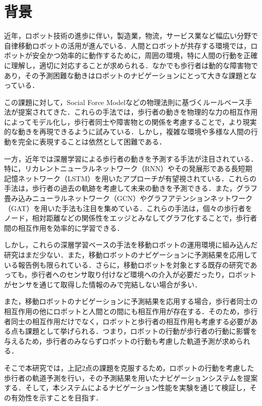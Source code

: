 
\section{背景}
近年，ロボット技術の進歩に伴い，製造業，物流，サービス業など幅広い分野で自律移動ロボットの活用が進んでいる．人間とロボットが共存する環境では，ロボットが安全かつ効率的に動作するために，周囲の環境，特に人間の行動を正確に理解し，適切に対応することが求められる．なかでも歩行者は動的な障害物であり，その予測困難な動きはロボットのナビゲーションにとって大きな課題となっている．

この課題に対して，Social Force Model\cite{s-force-model}などの物理法則に基づくルールベース手法が提案されてきた．これらの手法では，歩行者の動きを物理的な力の相互作用によってモデル化し，歩行者同士や障害物との関係を考慮することで，より現実的な動きを再現できるように試みている．しかし，複雑な環境や多様な人間の行動を完全に表現することは依然として困難である．

一方，近年では深層学習による歩行者の動きを予測する手法が注目されている．特に，リカレントニューラルネットワーク（RNN）\cite{rumelhart1986learning1,rumelhart1986learning2}やその発展形である長短期記憶ネットワーク（LSTM）\cite{hochreiter1997long}を用いたアプローチが有望視されている．これらの手法は，歩行者の過去の軌跡を考慮して未来の動きを予測できる．また，グラフ畳み込みニューラルネットワーク（GCN）\cite{kipf2016semi-gcn}やグラフアテンションネットワーク（GAT）\cite{velickovic2017graph-gat}を用いた手法も注目を集めている．これらの手法は，個々の歩行者をノード，相対距離などの関係性をエッジとみなしてグラフ化することで，歩行者間の相互作用を効率的に学習できる．

しかし，これらの深層学習ベースの手法を移動ロボットの運用環境に組み込んだ研究はまだ少ない．また，移動ロボットのナビゲーションに予測結果を応用している報告例も限られている．さらに，移動ロボットを対象とする既存の研究であっても，歩行者へのセンサ取り付けなど環境への介入が必要だったり，ロボットがセンサを通じて取得した情報のみで完結しない場合が多い．

また，移動ロボットのナビゲーションに予測結果を応用する場合，歩行者同士の相互作用の他にロボットと人間との間にも相互作用が存在する．そのため，歩行者同士の相互作用だけでなく，ロボットと歩行者の相互作用も考慮する必要がある点も課題として挙げられる．つまり，ロボットの行動が歩行者の行動に影響を与えるため，歩行者のみならずロボットの行動も考慮した軌道予測が求められる．

そこで本研究では，上記2点の課題を克服するため，ロボットの行動を考慮した歩行者の軌道予測を行い，その予測結果を用いたナビゲーションシステムを提案する．そして，本システムによるナビゲーション性能を実験を通じて検証し，その有効性を示すことを目指す．

\newpage
